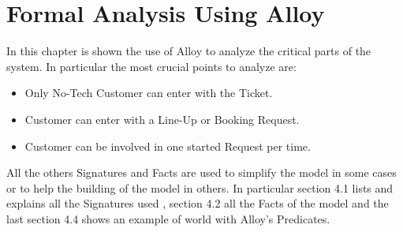 \chapter{Formal Analysis Using Alloy}

In this chapter is shown the use of Alloy to analyze the critical parts of the system. In particular the most crucial points to analyze are:
\begin{itemize}
	\item Only No-Tech Customer can enter with the Ticket.
	\item Customer can enter with a Line-Up or Booking Request.
	\item Customer can be involved in one started Request per time. \\
\end{itemize}
All the others Signatures and Facts are used to simplify the model in some cases or to help the building of the model in others.
In particular section 4.1 lists and explains all the Signatures used , section 4.2 all the Facts of the model and the last section 4.4 shows an example of world with Alloy's Predicates.



%


